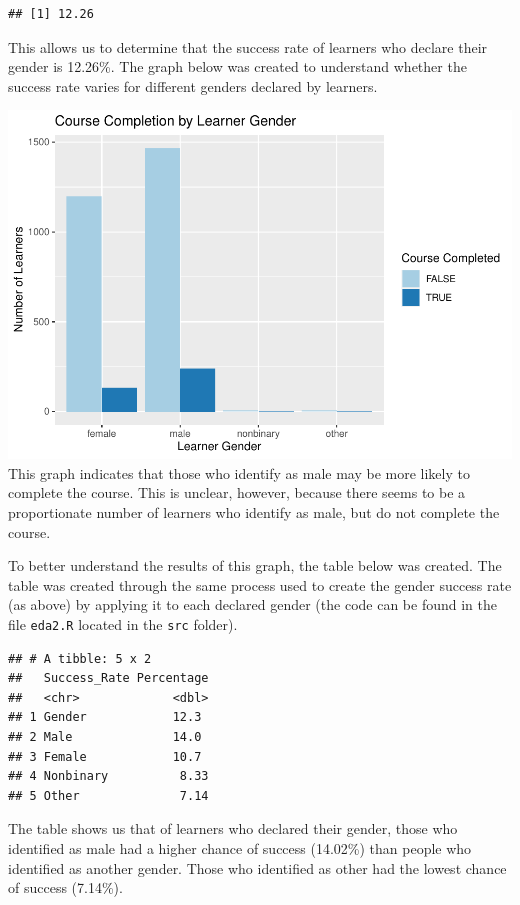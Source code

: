 \documentclass[
]{article}
\begin{document}
\begin{verbatim}
## [1] 12.26
\end{verbatim}

This allows us to determine that the success rate of learners who
declare their gender is 12.26\%. The graph below was created to
understand whether the success rate varies for different genders
declared by learners.

\includegraphics{CSC8631-Report---210431461_files/figure-latex/gender_completion-1.pdf}
This graph indicates that those who identify as male may be more likely
to complete the course. This is unclear, however, because there seems to
be a proportionate number of learners who identify as male, but do not
complete the course.

To better understand the results of this graph, the table below was
created. The table was created through the same process used to create
the gender success rate (as above) by applying it to each declared
gender (the code can be found in the file \texttt{eda2.R} located in the
\texttt{src} folder).

\begin{verbatim}
## # A tibble: 5 x 2
##   Success_Rate Percentage
##   <chr>             <dbl>
## 1 Gender            12.3 
## 2 Male              14.0 
## 3 Female            10.7 
## 4 Nonbinary          8.33
## 5 Other              7.14
\end{verbatim}

The table shows us that of learners who declared their gender, those who
identified as male had a higher chance of success (14.02\%) than people
who identified as another gender. Those who identified as other had the
lowest chance of success (7.14\%).
\end{document}
